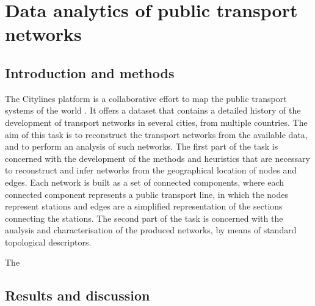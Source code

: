 \chapter{Data analytics of public transport networks}


\section{Introduction and methods}
 The Citylines platform is a collaborative effort to map the public transport systems of the world \cite{Citylines}. It offers a dataset that contains a detailed history of the development of transport networks in several cities, from multiple countries. The aim of this task is to reconstruct the transport networks from the available data, and to perform an analysis of such networks. The first part of the task is concerned with the development of the methods and heuristics that are necessary to reconstruct and infer networks from the geographical location of nodes and edges. Each network is built as a set of connected components, where each connected component represents a public transport line, in which the nodes represent stations and edges are a simplified representation of the sections connecting the stations. The second part of the task is concerned with the analysis and characterisation of the produced networks, by means of standard topological descriptors.
 
 The 


\section{Results and discussion}



\newpage